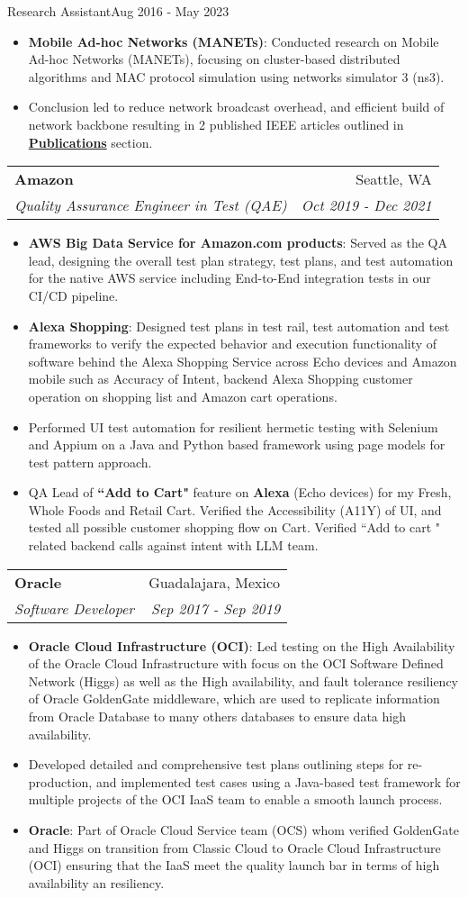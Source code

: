 \documentclass[letterpaper,11pt]{article}
\makeatletter
\newcommand{\resumeItem}[2]{
  \item\small{
    \textbf{#1}{: #2 \vspace{-2pt}}
  }
}
\newcommand{\resumeSubheading}[4]{
  \vspace{-1pt}\item
    \begin{tabular*}{0.97\textwidth}{l@{\extracolsep{\fill}}r}
      \textbf{#1} & #2 \\
      \textit{\small#3} & \textit{\small #4} \\
    \end{tabular*}\vspace{-5pt}
}
\newcommand{\resumeSubItem}[1]{
  \item\small{
    {#1 \vspace{-2pt}}
  }
}
\newcommand{\resumeItemListStart}{\begin{itemize}}
\newcommand{\resumeItemListEnd}{\end{itemize}\vspace{-5pt}}
\makeatother
\begin{document}
      {Research Assistant}{Aug 2016 - May 2023}
      \resumeItemListStart
      	\resumeItem{Mobile Ad-hoc Networks (MANETs)}
          {Conducted research on Mobile Ad-hoc Networks (MANETs), focusing on cluster-based distributed algorithms and MAC protocol simulation using networks simulator 3 (ns3).}
          \resumeSubItem{Conclusion led to reduce network broadcast overhead, and efficient build of network backbone resulting in 2 published IEEE articles outlined in \hyperref[sec:Publications]{\textbf{Publications}} section.}
      \resumeItemListEnd
          \resumeSubheading
      {Amazon}{Seattle, WA}
      {Quality Assurance Engineer in Test (QAE)}{Oct 2019 - Dec 2021}
      \resumeItemListStart
      \resumeItem{AWS Big Data Service for Amazon.com products}
          {Served as the QA lead, designing the overall test plan strategy, test plans, and test automation for the native AWS service including End-to-End integration tests in our CI/CD pipeline.}
      \resumeItem{Alexa Shopping}
          {Designed test plans in test rail, test automation and test frameworks to verify the expected behavior and execution functionality of software behind the Alexa Shopping Service across Echo devices and Amazon mobile such as Accuracy of Intent, backend Alexa Shopping customer operation on shopping list and Amazon cart operations.}
    \resumeSubItem{Performed UI test automation for resilient hermetic testing with Selenium and Appium on a Java and Python based framework using page models for test pattern approach.}   
    \resumeSubItem{
        QA Lead of \textbf{``Add to Cart"} feature on \textbf{Alexa} (Echo devices) for my Fresh, Whole Foods and Retail Cart. Verified the Accessibility (A11Y) of UI, and tested all possible customer shopping flow on Cart. Verified ``Add to cart " related backend calls against intent with LLM team.}
      \resumeItemListEnd
    \resumeSubheading
      {Oracle}{Guadalajara, Mexico}
      {Software Developer}{Sep 2017 - Sep 2019}
      \resumeItemListStart
        \resumeItem{Oracle Cloud Infrastructure (OCI)}
          {Led testing on the High Availability of the Oracle Cloud Infrastructure with focus on the OCI Software Defined Network (Higgs) as well as the High availability, and fault tolerance resiliency of Oracle GoldenGate middleware, which are used to replicate information from Oracle Database to many others databases to ensure data high availability.}
          \resumeSubItem{Developed detailed and comprehensive test plans outlining steps for re-production, and implemented test cases using a Java-based test framework for multiple projects of the OCI IaaS team to enable a smooth launch process.}
          \resumeItem{Oracle}
        {Part of Oracle Cloud Service team (OCS) whom verified GoldenGate and Higgs on transition from Classic Cloud to Oracle Cloud Infrastructure (OCI) ensuring that the IaaS meet the quality launch bar in terms of high availability an resiliency. \newline}
      \resumeItemListEnd
     
\end{document}
